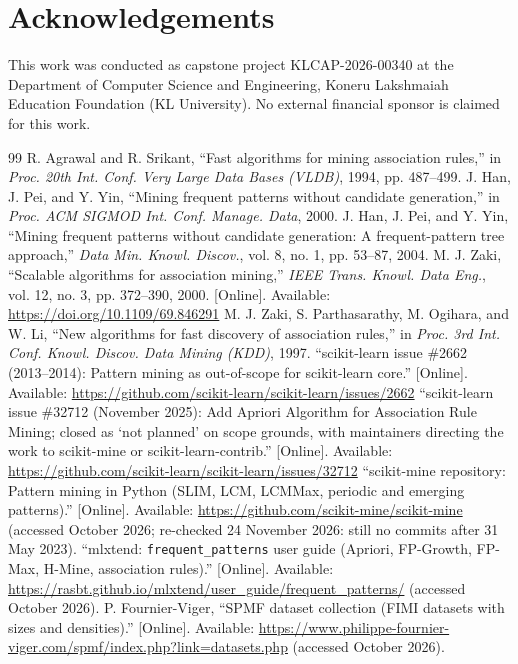 \documentclass[journal,a4paper]{IEEEtran}
\begin{document}
\section*{Acknowledgements}
This work was conducted as capstone project KLCAP-2026-00340 at the Department
of Computer Science and Engineering, Koneru Lakshmaiah Education Foundation
(KL University). No external financial sponsor is claimed for this work.

\begin{thebibliography}{99}\footnotesize
{} R. Agrawal and R. Srikant, ``Fast algorithms for mining association rules,'' in \emph{Proc. 20th Int. Conf. Very Large Data Bases (VLDB)}, 1994, pp. 487--499.
 J. Han, J. Pei, and Y. Yin, ``Mining frequent patterns without candidate generation,'' in \emph{Proc. ACM SIGMOD Int. Conf. Manage. Data}, 2000.
 J. Han, J. Pei, and Y. Yin, ``Mining frequent patterns without candidate generation: A frequent-pattern tree approach,'' \emph{Data Min. Knowl. Discov.}, vol. 8, no. 1, pp. 53--87, 2004.
 M. J. Zaki, ``Scalable algorithms for association mining,'' \emph{IEEE Trans. Knowl. Data Eng.}, vol. 12, no. 3, pp. 372--390, 2000. [Online]. Available: \url{https://doi.org/10.1109/69.846291}
 M. J. Zaki, S. Parthasarathy, M. Ogihara, and W. Li, ``New algorithms for fast discovery of association rules,'' in \emph{Proc. 3rd Int. Conf. Knowl. Discov. Data Mining (KDD)}, 1997.
 ``scikit-learn issue \#2662 (2013--2014): Pattern mining as out-of-scope for scikit-learn core.'' [Online]. Available: \url{https://github.com/scikit-learn/scikit-learn/issues/2662}
 ``scikit-learn issue \#32712 (November 2025): Add Apriori Algorithm for Association Rule Mining; closed as `not planned' on scope grounds, with maintainers directing the work to scikit-mine or scikit-learn-contrib.'' [Online]. Available: \url{https://github.com/scikit-learn/scikit-learn/issues/32712}
 ``scikit-mine repository: Pattern mining in Python (SLIM, LCM, LCMMax, periodic and emerging patterns).'' [Online]. Available: \url{https://github.com/scikit-mine/scikit-mine} (accessed October 2026; re-checked 24 November 2026: still no commits after 31 May 2023).
 ``mlxtend: \texttt{frequent\_patterns} user guide (Apriori, FP-Growth, FP-Max, H-Mine, association rules).'' [Online]. Available: \url{https://rasbt.github.io/mlxtend/user_guide/frequent_patterns/} (accessed October 2026).
 P. Fournier-Viger, ``SPMF dataset collection (FIMI datasets with sizes and densities).'' [Online]. Available: \url{https://www.philippe-fournier-viger.com/spmf/index.php?link=datasets.php} (accessed October 2026).

\end{thebibliography}
\end{document}
